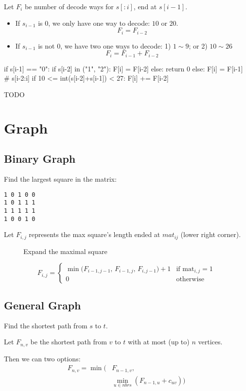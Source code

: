 Let $F_i$ be number of decode ways for $s[:i]$, end at $s[i-1]$. 

\begin{itemize}
\item If $s_{i-1}$ is 0, we only have one way to decode: $10$ or $20$.
$$
F_i = F_{i-2}
$$ 
\item If $s_{i-1}$ is not 0, we have two one ways to decode: 1) $1 \sim 9$; or 2) $10 \sim26$
$$
F_i = F_{i-1}+F_{i-2}
$$
\end{itemize}
\begin{python}
if s[i-1] == "0":
    if s[i-2] in ("1", "2"):
        F[i] = F[i-2]
    else:
        return 0
else:
    F[i] = F[i-1]
    # s[i-2:i]
    if 10 <= int(s[i-2]+s[i-1]) < 27:
        F[i] += F[i-2]
\end{python}
 TODO
\section{Graph}
\subsection{Binary Graph}
 Find the largest square in the matrix:
\begin{lstlisting}
1 0 1 0 0
1 0 1 1 1
1 1 1 1 1
1 0 0 1 0
\end{lstlisting}
Let $F_{i, j}$ represents the max square's length ended at $mat_{ij}$ (lower right
corner).

\begin{figure}[!htp]
\centering
{}
\caption{Expand the maximal square}
\label{fig:squareMatrix}
\end{figure}

\[
F_{i,j} =
  \begin{cases}
  \min\bigl(F_{i-1,j-1},\, F_{i-1,j},\, F_{i,j-1}\bigr) + 1  & \text{if } \mathrm{mat}_{i,j}=1 \\
   0 & \text{otherwise}
\end{cases}
\]
\subsection{General Graph}
 Find the shortest path from $s$ to $t$. 

Let $F_{n, v}$ be the shortest path from $v$ to $t$ with at most (up to) $n$ vertices. 

Then we can two options:
\begin{align*}
F_{n, v} = \min\Big(& F_{n-1, v}, \\
& \min_{u \in nbrs}(F_{n-1, u}+c_{uv})\Big)
\end{align*}

